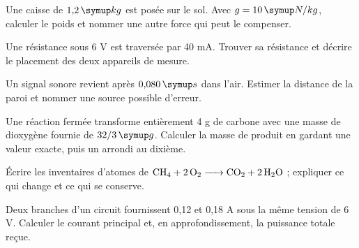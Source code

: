 \par\noindent\begin{minipage}{\linewidth}
Une caisse de $1{,}2\unite{kg}$ est posée sur le sol. Avec $g=10\unite{N/kg}$, calculer le poids et nommer une autre force qui peut le compenser.\par
\end{minipage}\par
\par\noindent\begin{minipage}{\linewidth}
Une résistance sous 6 V est traversée par 40 mA. Trouver sa résistance et décrire le placement des deux appareils de mesure.\par
\end{minipage}\par
\par\noindent\begin{minipage}{\linewidth}
Un signal sonore revient après $0{,}080\unite s$ dans l’air. Estimer la distance de la paroi et nommer une source possible d’erreur.\par
\end{minipage}\par
{}\pcGrille{}
\label{sujet-E2}
\par\noindent\begin{minipage}{\linewidth}
Une réaction fermée transforme entièrement 4 g de carbone avec une masse de dioxygène fournie de $32/3\unite g$. Calculer la masse de produit en gardant une valeur exacte, puis un arrondi au dixième.\par
\end{minipage}\par
\par\noindent\begin{minipage}{\linewidth}
Écrire les inventaires d’atomes de $\ce{CH4 + 2O2 -> CO2 + 2H2O}$ ; expliquer ce qui change et ce qui se conserve.\par
\end{minipage}\par
\par\noindent\begin{minipage}{\linewidth}
Deux branches d’un circuit fournissent 0,12 et 0,18 A sous la même tension de 6 V. Calculer le courant principal et, en approfondissement, la puissance totale reçue.\par
\end{minipage}\par
